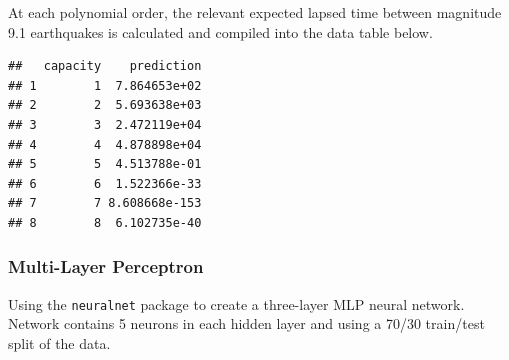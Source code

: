 At each polynomial order, the relevant expected lapsed time between
magnitude 9.1 earthquakes is calculated and compiled into the data table
below.

\begin{Shaded}
\begin{Highlighting}[]
\OtherTok{\textless{}{-}} \SpecialCharTok{:}
\OtherTok{\textless{}{-}} 

\OtherTok{\textless{}{-}} \NormalTok{(}\SpecialCharTok{\textasciitilde{}} 
\OtherTok{\textless{}{-}}  \NormalTok{(} \NormalTok{))}
\OtherTok{\textless{}{-}} \SpecialCharTok{/}\SpecialCharTok{\^{}}
\NormalTok{\}}

\end{Highlighting}
\end{Shaded}

\begin{verbatim}
##   capacity    prediction
## 1        1  7.864653e+02
## 2        2  5.693638e+03
## 3        3  2.472119e+04
## 4        4  4.878898e+04
## 5        5  4.513788e-01
## 6        6  1.522366e-33
## 7        7 8.608668e-153
## 8        8  6.102735e-40
\end{verbatim}


\hypertarget{multi-layer-perceptron}{%
\subsubsection{Multi-Layer Perceptron}\label{multi-layer-perceptron}}

Using the \texttt{neuralnet} package \cite{neuralnet} to create a
three-layer MLP neural network. Network contains 5 neurons in each
hidden layer and using a 70/30 train/test split of the data.

